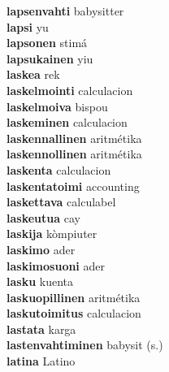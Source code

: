 \textbf{lapsenvahti } babysitter \\
\textbf{lapsi } yu \\
\textbf{lapsonen } stimá \\
\textbf{lapsukainen } yiu \\
\textbf{laskea } rek \\
\textbf{laskelmointi } calculacion \\
\textbf{laskelmoiva } bispou \\
\textbf{laskeminen } calculacion \\
\textbf{laskennallinen } aritmétika \\
\textbf{laskennollinen } aritmétika \\
\textbf{laskenta } calculacion \\
\textbf{laskentatoimi } accounting \\
\textbf{laskettava } calculabel \\
\textbf{laskeutua } cay \\
\textbf{laskija } kòmpiuter \\
\textbf{laskimo } ader \\
\textbf{laskimosuoni } ader \\
\textbf{lasku } kuenta \\
\textbf{laskuopillinen } aritmétika \\
\textbf{laskutoimitus } calculacion \\
\textbf{lastata } karga \\
\textbf{lastenvahtiminen } babysit (s.) \\
\textbf{latina } Latino \\
